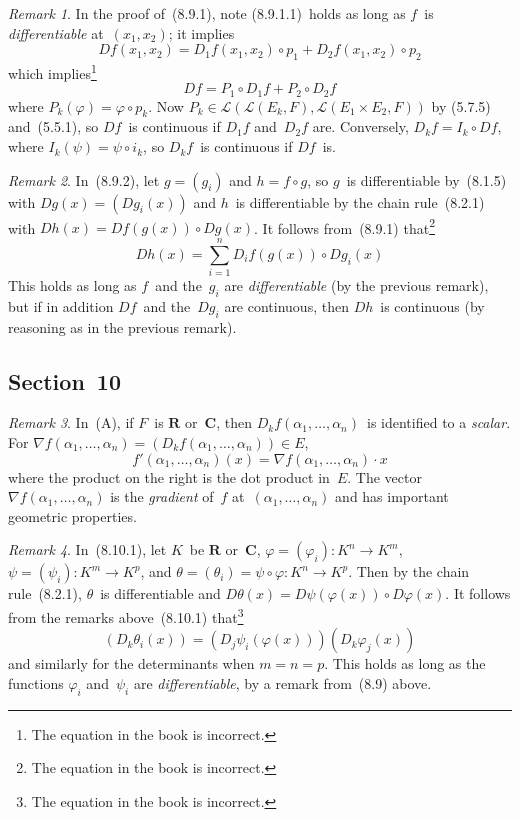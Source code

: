 \documentclass[letterpaper,12pt]{article}
\newcommand{\R}{\mathbf{R}}
\newcommand{\C}{\mathbf{C}}
\renewcommand{\L}{\mathcal{L}}
\newcommand{\after}{\circ}
\newcommand{\grad}{\nabla}
\theoremstyle{plain}
\theoremstyle{definition}
\theoremstyle{remark}
\newtheorem*{rmk}{Remark}
\begin{document}
\begin{rmk}
In the proof of~(8.9.1), note (8.9.1.1)~holds as long as \(f\)~is \emph{differentiable} at~\((x_1,x_2)\); it implies
\[Df(x_1,x_2)=D_1f(x_1,x_2)\after p_1+D_2f(x_1,x_2)\after p_2\]
which implies\footnote{The equation in the book is incorrect.}
\[Df=P_1\after D_1f+P_2\after D_2f\]
where \(P_k(\varphi)=\varphi\after p_k\). Now \(P_k\in\L(\L(E_k,F),\L(E_1\times E_2,F))\) by (5.7.5) and~(5.5.1), so \(Df\)~is continuous if \(D_1f\) and~\(D_2f\) are. Conversely, \(D_kf=I_k\after Df\), where \(I_k(\psi)=\psi\after i_k\), so \(D_kf\)~is continuous if \(Df\)~is.
\end{rmk}

\begin{rmk}
In~(8.9.2), let \(g=(g_i)\) and \(h=f\after g\), so \(g\)~is differentiable by~(8.1.5) with \(Dg(x)=(Dg_i(x))\) and \(h\)~is differentiable by the chain rule~(8.2.1) with \(Dh(x)=Df(g(x))\after Dg(x)\). It follows from~(8.9.1) that\footnote{The equation in the book is incorrect.}
\[Dh(x)=\sum_{i=1}^nD_if(g(x))\after Dg_i(x)\]
This holds as long as \(f\)~and the~\(g_i\) are \emph{differentiable} (by the previous remark), but if in addition \(Df\)~and the~\(Dg_i\) are continuous, then \(Dh\)~is continuous (by reasoning as in the previous remark).
\end{rmk}

\subsection*{Section~10}
\begin{rmk}
In~(A), if \(F\)~is \(\R\) or~\(\C\), then \(D_kf(\alpha_1,\ldots,\alpha_n)\)~is identified to a \emph{scalar}. For \(\grad f(\alpha_1,\ldots,\alpha_n)=(D_kf(\alpha_1,\ldots,\alpha_n))\in E\),
\[f'(\alpha_1,\ldots,\alpha_n)(x)=\grad f(\alpha_1,\ldots,\alpha_n)\cdot x\]
where the product on the right is the dot product in~\(E\). The vector \(\grad f(\alpha_1,\ldots,\alpha_n)\) is the \emph{gradient} of~\(f\) at~\((\alpha_1,\ldots,\alpha_n)\) and has important geometric properties.
\end{rmk}

\begin{rmk}
In~(8.10.1), let \(K\)~be \(\R\) or~\(\C\), \(\varphi=(\varphi_i):K^n\to K^m\), \(\psi=(\psi_i):K^m\to K^p\), and \(\theta=(\theta_i)=\psi\after\varphi:K^n\to K^p\). Then by the chain rule~(8.2.1), \(\theta\)~is differentiable and \(D\theta(x)=D\psi(\varphi(x))\after D\varphi(x)\). It follows from the remarks above~(8.10.1) that\footnote{The equation in the book is incorrect.}
\[(D_k\theta_i(x))=(D_j\psi_i(\varphi(x)))(D_k\varphi_j(x))\]
and similarly for the determinants when \(m=n=p\). This holds as long as the functions \(\varphi_i\) and~\(\psi_i\) are \emph{differentiable}, by a remark from~(8.9) above.
\end{rmk}
\end{document}
